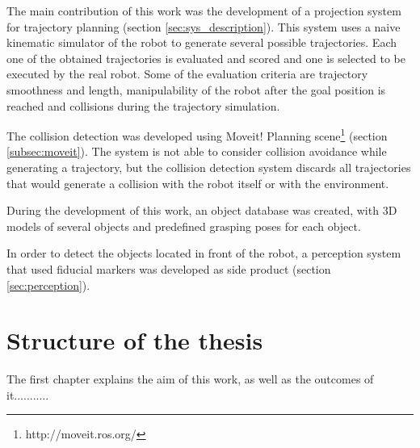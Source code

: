 The main contribution of this work was the development of a projection system for trajectory planning (section \ref{sec:sys_description}). This system uses a naive kinematic simulator of the robot to generate several possible trajectories. Each one of the obtained trajectories is evaluated and scored and one is selected to be executed by the real robot. Some of the evaluation criteria are trajectory smoothness and length, manipulability of the robot after the goal position is reached and collisions during the trajectory simulation.

The collision detection was developed using Moveit! Planning scene\footnote{http://moveit.ros.org/} (section \ref{subsec:moveit}). The system is not able to consider collision avoidance while generating a trajectory, but the collision detection system discards all trajectories that would generate a collision with the robot itself or with the environment.

During the development of this work, an object database was created, with 3D models of several objects and predefined grasping poses for each object.

In order to detect the objects located in front of the robot, a perception system that used fiducial markers was developed as side product (section \ref{sec:perception}).


\section{Structure of the thesis}

The first chapter explains the aim of this work, as well as the outcomes of it...........

